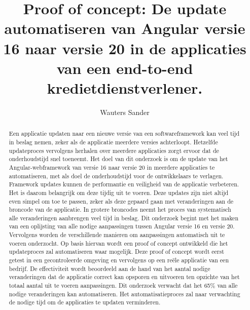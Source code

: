 \documentclass{hogent-article}
\title{Proof of concept: De update automatiseren van Angular versie 16 naar versie 20 in de applicaties van een end-to-end kredietdienstverlener.}
\author{Wauters Sander}
\begin{document}
\begin{abstract}

Een applicatie updaten naar een nieuwe versie van een softwareframework kan veel tijd in beslag nemen, zeker als de applicatie meerdere versies achterloopt.
Hetzelfde updateproces vervolgens herhalen over meerdere applicaties zorgt ervoor dat de onderhoudstijd snel toeneemt.
Het doel van dit onderzoek is om de update van het Angular-webframework van versie 16 naar versie 20 in meerdere applicaties te automatiseren, met als doel de onderhoudstijd voor de ontwikkelaars te verlagen.
Framework updates kunnen de performantie en veiligheid van de applicatie verbeteren.
Het is daarom belangrijk om deze tijdig uit te voeren.
Deze updates zijn niet altijd even simpel om toe te passen, zeker als deze gepaard gaan met veranderingen aan de broncode van de applicatie.
In grotere broncodes neemt het proces van systematisch alle veranderingen aanbrengen veel tijd in beslag.
Dit onderzoek begint met het maken van een oplijsting van alle nodige aanpassingen tussen Angular versie 16 en versie 20.
Vervolgens worden de verschillende manieren om aanpassingen automatisch uit te voeren onderzocht.
Op basis hiervan wordt een proof of concept ontwikkeld die het updateproces zal automatiseren waar mogelijk.
Deze proof of concept wordt eerst getest in een gecontroleerde omgeving en vervolgens op een reële applicatie van een bedrijf.
De effectiviteit wordt beoordeeld aan de hand van het aantal nodige veranderingen dat de applicatie correct kan opsporen en uitvoeren ten opzichte van het totaal aantal uit te voeren aanpassingen.
Dit onderzoek verwacht dat het 65\% van alle nodige veranderingen kan automatiseren.
Het automatisatieproces zal naar verwachting de nodige tijd om de applicaties te updaten verminderen.

\end{abstract}

\tableofcontents



\printbibliography[heading=bibintoc]
\end{document}
